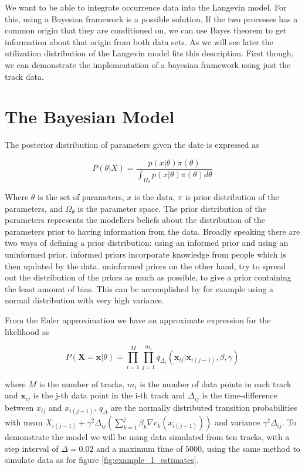 
We want to be able to integrate occurrence data into the Langevin model. For this, using a Bayesian framework is a possible solution. If the two processes has a common origin that they are conditioned on, we can use Bayes theorem to get information about that origin from both data sets. As we will see later the utilization distribution of the Langevin model fits this description. First though, we can demonstrate the implementation of a bayesian framework using just the track data. 


\section{The Bayesian Model}
The posterior distribution of parameters given the date is expressed as

$$
P(\theta | X) = \frac{p(x|\theta) \pi(\theta)}{\int_{\Omega_\theta} p(x|\theta)\pi(\theta)d\theta}
$$

Where $\theta$ is the set of parameters, $x$ is the data, $\pi$ is prior distribution of the parameters, and $\Omega_\theta$ is the parameter space. The prior distribution of the parameters represents the modellers beliefs about the distribution of the parameters prior to having information from the data. Broadly speaking there are two ways of defining a prior distribution: using an informed prior and using an uninformed prior. informed priors incorporate knowledge from people which is then
updated by the data. uninformed priors on the other hand, try to spread out
the distribution of the priors as much as possible, to give a prior containing the least amount of bias. This can be accomplished by for example using a normal distribution with very high variance. 

From the Euler approximation we have an approximate expression for the likelihood as 

$$
P(\textbf{X} = \textbf{x}|\theta) = \prod_{i=1}^M \prod_{j=1}^{m_i} q_{\Delta_i}(\textbf{x}_{ij}|\textbf{x}_{i(j-1)}, \beta, \gamma)
$$

where $M$ is the number of tracks, $m_i$ is the number of data points in each track and $\textbf{x}_{ij}$ is the j-th data point in the i-th track and $\Delta_{ij}$ is the time-difference between $x_{ij}$ and $x_{i(j-1)}$. $q_{\Delta}$ are the normally distributed transition probabilities with mean $X_{i(j-1)} + \gamma^2\Delta_{ij}(\sum_{k = 1}^j \beta_k \nabla c_k(x_{i(j-1)}))$ and variance $\gamma^2\Delta_{ij}$. To demonstrate the model we will be using data simulated from ten tracks, with a step interval of $\Delta = 0.02$ and a maximum time of $5000$, using the same method to simulate data as for figure \ref{fig:example_1_estimates}.

